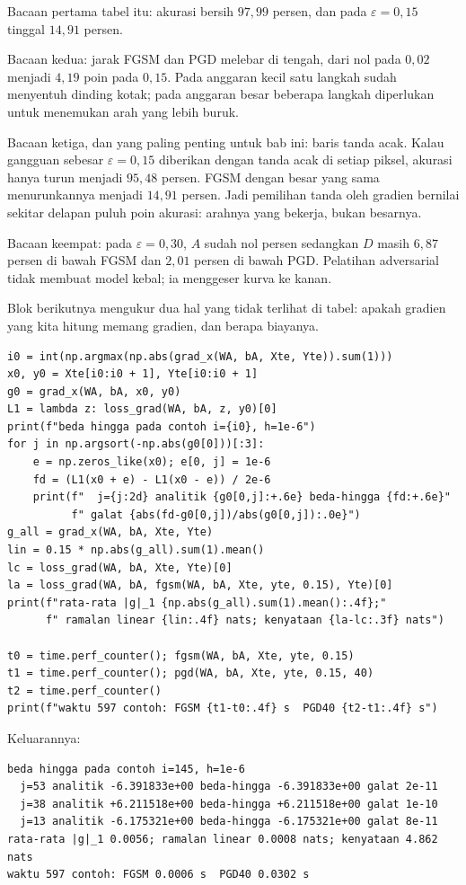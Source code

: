 Bacaan pertama tabel itu: akurasi bersih $97{,}99$ persen, dan pada
$\varepsilon=0{,}15$ tinggal $14{,}91$ persen.

Bacaan kedua: jarak FGSM dan PGD melebar di tengah, dari nol pada $0{,}02$ menjadi
$4{,}19$ poin pada $0{,}15$. Pada anggaran kecil satu langkah sudah menyentuh dinding
kotak; pada anggaran besar beberapa langkah diperlukan untuk menemukan arah yang lebih
buruk.

Bacaan ketiga, dan yang paling penting untuk bab ini: baris tanda acak. Kalau
gangguan sebesar $\varepsilon=0{,}15$ diberikan dengan tanda acak di setiap piksel,
akurasi hanya turun menjadi $95{,}48$ persen. FGSM dengan besar yang sama
menurunkannya menjadi $14{,}91$ persen. Jadi pemilihan tanda oleh gradien bernilai
sekitar delapan puluh poin akurasi: arahnya yang bekerja, bukan besarnya.

Bacaan keempat: pada $\varepsilon=0{,}30$, $A$ sudah nol persen sedangkan $D$ masih
$6{,}87$ persen di bawah FGSM dan $2{,}01$ persen di bawah PGD. Pelatihan adversarial
tidak membuat model kebal; ia menggeser kurva ke kanan.

Blok berikutnya mengukur dua hal yang tidak terlihat di tabel: apakah gradien yang
kita hitung memang gradien, dan berapa biayanya.

\begin{verbatim}
i0 = int(np.argmax(np.abs(grad_x(WA, bA, Xte, Yte)).sum(1)))
x0, y0 = Xte[i0:i0 + 1], Yte[i0:i0 + 1]
g0 = grad_x(WA, bA, x0, y0)
L1 = lambda z: loss_grad(WA, bA, z, y0)[0]
print(f"beda hingga pada contoh i={i0}, h=1e-6")
for j in np.argsort(-np.abs(g0[0]))[:3]:
    e = np.zeros_like(x0); e[0, j] = 1e-6
    fd = (L1(x0 + e) - L1(x0 - e)) / 2e-6
    print(f"  j={j:2d} analitik {g0[0,j]:+.6e} beda-hingga {fd:+.6e}"
          f" galat {abs(fd-g0[0,j])/abs(g0[0,j]):.0e}")
g_all = grad_x(WA, bA, Xte, Yte)
lin = 0.15 * np.abs(g_all).sum(1).mean()
lc = loss_grad(WA, bA, Xte, Yte)[0]
la = loss_grad(WA, bA, fgsm(WA, bA, Xte, yte, 0.15), Yte)[0]
print(f"rata-rata |g|_1 {np.abs(g_all).sum(1).mean():.4f};"
      f" ramalan linear {lin:.4f} nats; kenyataan {la-lc:.3f} nats")

t0 = time.perf_counter(); fgsm(WA, bA, Xte, yte, 0.15)
t1 = time.perf_counter(); pgd(WA, bA, Xte, yte, 0.15, 40)
t2 = time.perf_counter()
print(f"waktu 597 contoh: FGSM {t1-t0:.4f} s  PGD40 {t2-t1:.4f} s")
\end{verbatim}

Keluarannya:

\begin{verbatim}
beda hingga pada contoh i=145, h=1e-6
  j=53 analitik -6.391833e+00 beda-hingga -6.391833e+00 galat 2e-11
  j=38 analitik +6.211518e+00 beda-hingga +6.211518e+00 galat 1e-10
  j=13 analitik -6.175321e+00 beda-hingga -6.175321e+00 galat 8e-11
rata-rata |g|_1 0.0056; ramalan linear 0.0008 nats; kenyataan 4.862 nats
waktu 597 contoh: FGSM 0.0006 s  PGD40 0.0302 s
\end{verbatim}

